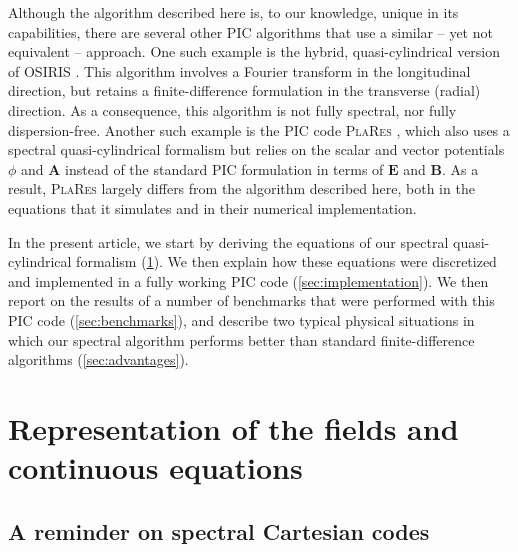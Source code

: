 \documentclass[1p,times,authoryear]{elsarticle}
\renewcommand{\vec}[1]{\boldsymbol{#1}}
\begin{document}
Although the algorithm described here is, to our knowledge, unique in
its capabilities, there are several other PIC algorithms that use 
a similar -- yet not equivalent -- approach. One such example is the
hybrid, quasi-cylindrical version of \textsc{OSIRIS} \citep{Yuarxiv2015}. This algorithm
involves a Fourier transform in the longitudinal direction, but
retains a finite-difference formulation in the transverse (radial)
direction. As a consequence, this algorithm is not fully spectral, nor
fully dispersion-free. Another such example is the PIC code \textsc{PlaRes} 
\citep{AndriyashJCP2015}, which also uses a spectral quasi-cylindrical
formalism but relies on the scalar and vector potentials
$\phi$ and $\vec{A}$ instead of the standard PIC formulation in terms
of $\vec{E}$ and $\vec{B}$. As a result, \textsc{PlaRes} largely differs from the
algorithm described here, both in the equations that it simulates and
in their numerical implementation.

In the present article, we start by deriving the equations of our
spectral quasi-cylindrical formalism (\cref{sec:theory}). We then explain
how these equations were discretized and implemented in a fully
working PIC code (\cref{sec:implementation}). We then report on the
results of a number of benchmarks that were performed with this PIC
code (\cref{sec:benchmarks}), and describe two typical physical situations in
which our spectral algorithm performs better than standard 
finite-difference algorithms (\cref{sec:advantages}).

\section{Representation of the fields and continuous equations}
\label{sec:theory}

\subsection{A reminder on spectral Cartesian codes}
\end{document}
